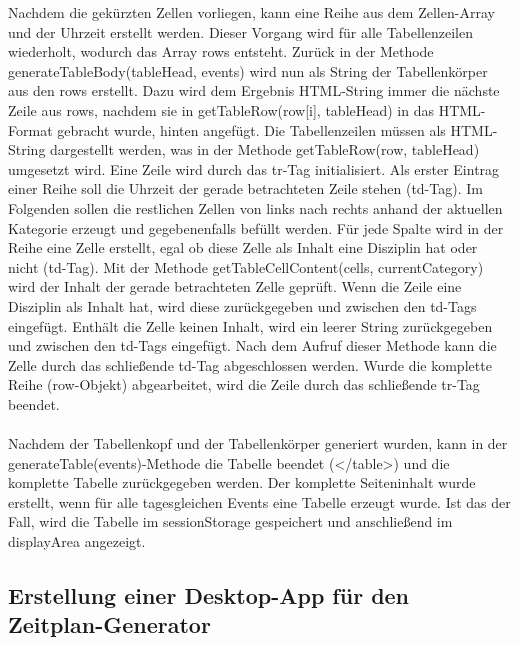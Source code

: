 Nachdem die gekürzten Zellen vorliegen, kann eine Reihe aus dem Zellen-Array und der Uhrzeit erstellt werden. Dieser Vorgang wird für alle Tabellenzeilen wiederholt, wodurch das Array rows entsteht.
Zurück in der Methode generateTableBody(tableHead, events) wird nun als String der Tabellenkörper aus den rows erstellt. Dazu wird dem Ergebnis HTML-String immer die nächste Zeile aus rows, nachdem sie in getTableRow(row[i], tableHead) in das HTML-Format gebracht wurde, hinten angefügt.
Die Tabellenzeilen müssen als HTML-String dargestellt werden, was in der Methode getTableRow(row, tableHead) umgesetzt wird. Eine Zeile wird durch das tr-Tag initialisiert. Als erster Eintrag einer Reihe soll die Uhrzeit der gerade betrachteten Zeile stehen (td-Tag). Im Folgenden sollen die restlichen Zellen von links nach rechts anhand der aktuellen Kategorie erzeugt und gegebenenfalls befüllt werden. Für jede Spalte wird in der Reihe eine Zelle erstellt, egal ob diese Zelle als Inhalt eine Disziplin hat oder nicht (td-Tag). Mit der Methode getTableCellContent(cells, currentCategory) wird der Inhalt der gerade betrachteten Zelle geprüft. Wenn die Zeile eine Disziplin als Inhalt hat, wird diese zurückgegeben und zwischen den td-Tags eingefügt. Enthält die Zelle keinen Inhalt, wird ein leerer String zurückgegeben und zwischen den td-Tags eingefügt. Nach dem Aufruf dieser Methode kann die Zelle durch das schließende td-Tag abgeschlossen werden. Wurde die komplette Reihe (row-Objekt) abgearbeitet, wird die Zeile durch das schließende tr-Tag beendet. \\
\\
Nachdem der Tabellenkopf und der Tabellenkörper generiert wurden, kann in der generateTable(events)-Methode die Tabelle beendet (</table>) und die komplette Tabelle zurückgegeben werden.
Der komplette Seiteninhalt wurde erstellt, wenn für alle tagesgleichen Events eine Tabelle erzeugt wurde. Ist das der Fall, wird die Tabelle im sessionStorage gespeichert und anschließend im displayArea angezeigt.

\subsection{Erstellung einer Desktop-App für den Zeitplan-Generator}

